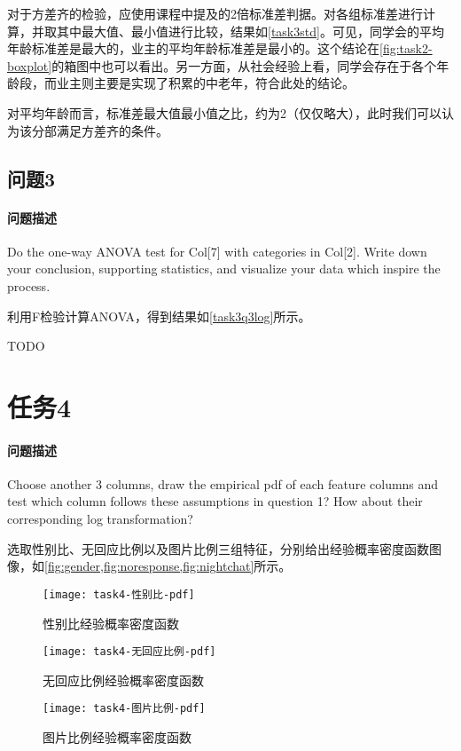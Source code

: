 \documentclass[a4paper,12pt]{article}
\begin{document}
    对于方差齐的检验，应使用课程中提及的2倍标准差判据。对各组标准差进行计算，并取其中最大值、最小值进行比较，结果如\cref{task3std}。可见，同学会的平均年龄标准差是最大的，业主的平均年龄标准差是最小的。这个结论在\cref{fig:task2-boxplot}的箱图中也可以看出。另一方面，从社会经验上看，同学会存在于各个年龄段，而业主则主要是实现了积累的中老年，符合此处的结论。
    

    对平均年龄而言，标准差最大值最小值之比，约为2（仅仅略大），此时我们可以认为该分部满足方差齐的条件。

    \subsection{问题3}
    \paragraph{问题描述} Do the one-way ANOVA test for Col[7] with categories in Col[2]. Write down your conclusion, supporting statistics, and visualize your data which inspire the process.

    利用F检验计算ANOVA，得到结果如\cref{task3q3log}所示。
    
    TODO

    \section{任务4} %
    \paragraph{问题描述} Choose another 3 columns, draw the empirical pdf of each feature columns and test which column follows these assumptions in question 1? How about their corresponding log transformation?

    选取性别比、无回应比例以及图片比例三组特征，分别给出经验概率密度函数图像，如\cref{fig:gender,fig:noresponse,fig:nightchat}所示。

    \begin{figure}[htbp]
        \centering
        \texttt{[image: task4-性别比-pdf]}
        \caption{性别比经验概率密度函数}
        \label{fig:gender}
    \end{figure}
    \begin{figure}[htbp]
        \centering
        \texttt{[image: task4-无回应比例-pdf]}
        \caption{无回应比例经验概率密度函数}
        \label{fig:noresponse}
    \end{figure}
    \begin{figure}[htbp]
        \centering
        \texttt{[image: task4-图片比例-pdf]}
        \caption{图片比例经验概率密度函数}
        \label{fig:nightchat}
    \end{figure}
\end{document}
